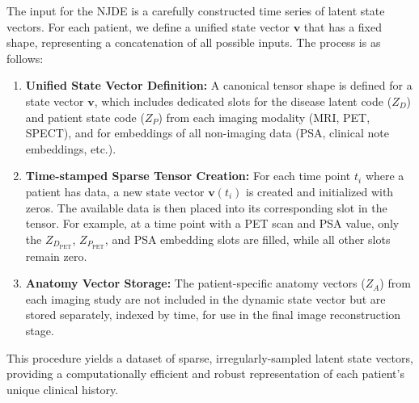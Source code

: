 \documentclass[11pt, a4paper]{article}
\begin{document}
The input for the NJDE is a carefully constructed time series of latent state vectors. For each patient, we define a unified state vector $\mathbf{v}$ that has a fixed shape, representing a concatenation of all possible inputs. The process is as follows:
\begin{enumerate}
    \item \textbf{Unified State Vector Definition:} A canonical tensor shape is defined for a state vector $\mathbf{v}$, which includes dedicated slots for the disease latent code ($Z_D$) and patient state code ($Z_P$) from each imaging modality (MRI, PET, SPECT), and for embeddings of all non-imaging data (PSA, clinical note embeddings, etc.).
    \item \textbf{Time-stamped Sparse Tensor Creation:} For each time point $t_i$ where a patient has data, a new state vector $\mathbf{v}(t_i)$ is created and initialized with zeros. The available data is then placed into its corresponding slot in the tensor. For example, at a time point with a PET scan and PSA value, only the $Z_{D_{\text{PET}}}$, $Z_{P_{\text{PET}}}$, and PSA embedding slots are filled, while all other slots remain zero.
    \item \textbf{Anatomy Vector Storage:} The patient-specific anatomy vectors ($Z_A$) from each imaging study are not included in the dynamic state vector but are stored separately, indexed by time, for use in the final image reconstruction stage.
\end{enumerate}
This procedure yields a dataset of sparse, irregularly-sampled latent state vectors, providing a computationally efficient and robust representation of each patient's unique clinical history.
\end{document}
